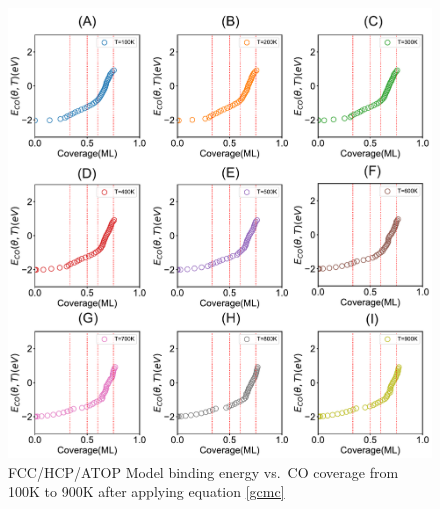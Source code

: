 \documentclass[11pt]{article}
\begin{document}
\begin{figure} [h]
\centering
\includegraphics[width=15cm]{Figure/3E-T.pdf}
\caption{FCC/HCP/ATOP Model binding energy vs.\ CO coverage from 100K to 900K after applying equation \ref{gcmc}}
\label{2E}
\end{figure}
\end{document}
